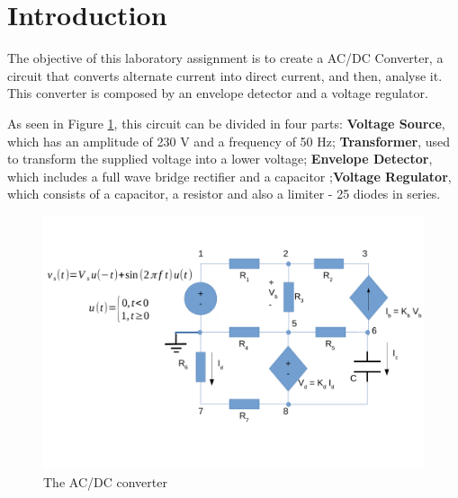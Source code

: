 \section{Introduction}
\label{sec:introduction}

The objective of this laboratory assignment is to create a AC/DC Converter, a circuit that converts alternate current into direct current, and then, analyse it. This converter is composed by an envelope detector and a voltage regulator.

As seen in Figure \ref{fig:rc}, this circuit can be divided in four parts: \textbf{Voltage Source}, which has an amplitude of 230 V and a frequency of 50 Hz; \textbf{Transformer}, used to transform the supplied voltage into a lower voltage; \textbf{Envelope Detector}, which includes a full wave bridge rectifier and a capacitor ;\textbf{Voltage Regulator}, which consists of a capacitor, a resistor and also a limiter - 25 diodes in series.

\begin{figure}[h] \centering
\includegraphics[width=0.99\linewidth]{rc.pdf}
\vspace{-5mm}
\caption{The AC/DC converter}
\label{fig:rc}
\end{figure}






